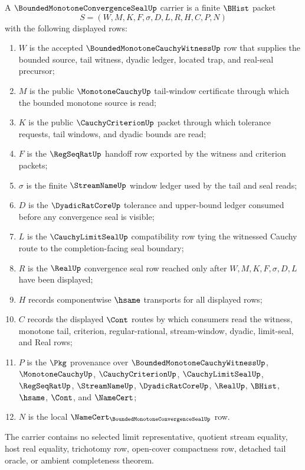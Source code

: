\begin{definition}
\label{def:bounded-monotone-convergence-seal-carrier}
A $\BoundedMonotoneConvergenceSealUp$ carrier is a finite $\BHist$ packet
$$
S=(W,M,K,F,\sigma,D,L,R,H,C,P,N)
$$
with the following displayed rows:
\begin{enumerate}
\item $W$ is the accepted $\BoundedMonotoneCauchyWitnessUp$ row that supplies the bounded source, tail witness, dyadic ledger, located trap, and real-seal precursor;
\item $M$ is the public $\MonotoneCauchyUp$ tail-window certificate through which the bounded monotone source is read;
\item $K$ is the public $\CauchyCriterionUp$ packet through which tolerance requests, tail windows, and dyadic bounds are read;
\item $F$ is the $\RegSeqRatUp$ handoff row exported by the witness and criterion packets;
\item $\sigma$ is the finite $\StreamNameUp$ window ledger used by the tail and seal reads;
\item $D$ is the $\DyadicRatCoreUp$ tolerance and upper-bound ledger consumed before any convergence seal is visible;
\item $L$ is the $\CauchyLimitSealUp$ compatibility row tying the witnessed Cauchy route to the completion-facing seal boundary;
\item $R$ is the $\RealUp$ convergence seal row reached only after $W,M,K,F,\sigma,D,L$ have been displayed;
\item $H$ records componentwise $\hsame$ transports for all displayed rows;
\item $C$ records the displayed $\Cont$ routes by which consumers read the witness, monotone tail, criterion, regular-rational, stream-window, dyadic, limit-seal, and Real rows;
\item $P$ is the $\Pkg$ provenance over $\BoundedMonotoneCauchyWitnessUp$, $\MonotoneCauchyUp$, $\CauchyCriterionUp$, $\CauchyLimitSealUp$, $\RegSeqRatUp$, $\StreamNameUp$, $\DyadicRatCoreUp$, $\RealUp$, $\BHist$, $\hsame$, $\Cont$, and $\NameCert$;
\item $N$ is the local $\NameCert_{\BoundedMonotoneConvergenceSealUp}$ row.
\end{enumerate}
The carrier contains no selected limit representative, quotient stream equality, host real equality, trichotomy row, open-cover compactness row, detached tail oracle, or ambient completeness theorem.
\end{definition}

